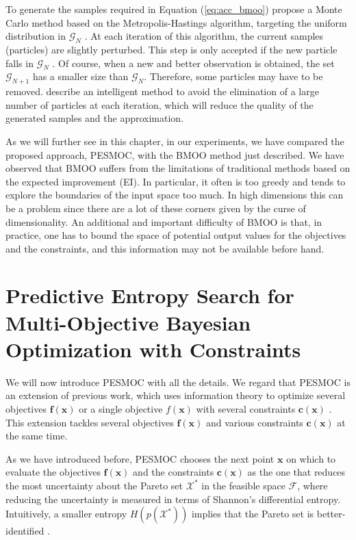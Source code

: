 To generate the samples required in Equation (\ref{eq:acc_bmoo}) propose a Monte Carlo method based
on the Metropolis-Hastings algorithm, targeting the uniform distribution in $\mathcal{G}_{N}$ \citep{feliot2015bayesian}. At each iteration of this
algorithm, the current samples (particles) are slightly perturbed. This step is only accepted if the new
particle falls in $\mathcal{G}_{N}$ . Of course, when a new and better observation is obtained,
the set $\mathcal{G}_{N+1}$ has a smaller size than $\mathcal{G}_{N}$. Therefore, some particles may have to be removed.
\cite{feliot2015bayesian} describe an intelligent method to avoid the elimination of a large number of particles at each
iteration, which will reduce the quality of the generated samples and the approximation.

As we will further see in this chapter, in our experiments, we have compared the proposed approach, PESMOC, with the BMOO method just described.
We have observed that BMOO suffers from the limitations of traditional methods based on the
expected improvement (EI). In particular, it often is too greedy and tends to explore the boundaries of the
input space too much. In high dimensions this can be a problem since there are a lot of these corners given by the curse of dimensionality.
An additional and important difficulty of BMOO is that, in practice, one has to bound the space of potential output values for the objectives and the constraints, and this information may not be available before hand.

\section{Predictive Entropy Search for Multi-Objective Bayesian Optimization with Constraints}\label{seq_pesmoc}

We will now introduce PESMOC with all the details. We regard that PESMOC is an extension of previous work, which uses information theory to optimize several objectives $\mathbf{f}(\mathbf{x})$ or a single objective $f(\mathbf{x})$ with
several constraints $\mathbf{c}(\mathbf{x})$ \citep{hernandez2016} \citep{hernandez2015predictive}. This extension tackles several objectives $\mathbf{f}(\mathbf{x})$ and various constraints $\mathbf{c}(\mathbf{x})$ at the same time.

As we have introduced before, PESMOC chooses the next point $\mathbf{x}$ on which to evaluate the objectives $\mathbf{f}(\mathbf{x})$ and the constraints $\mathbf{c}(\mathbf{x})$
as the one that reduces the most uncertainty about the Pareto set $\mathcal{X}^*$ in the feasible space $\mathcal{F}$, where reducing the uncertainty is measured in terms of Shannon's differential entropy.
Intuitively, a smaller entropy $H(p(\mathcal{X}^*))$ implies that the Pareto set is better-identified
\citep{villemonteix2009informational,hennig2012entropy,hernandez2014predictive}.


